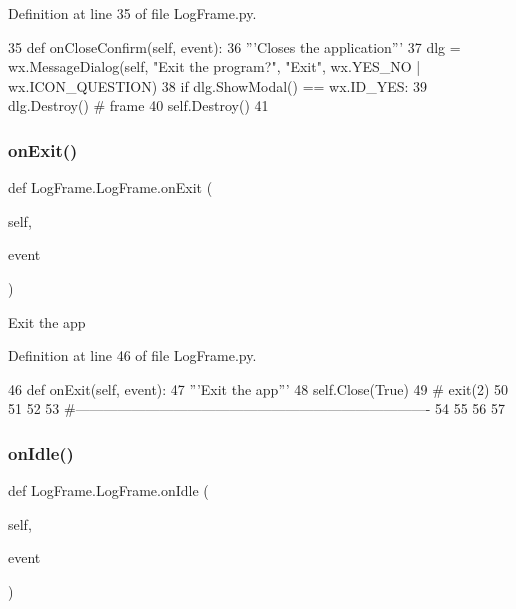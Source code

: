 Definition at line 35 of file Log\+Frame.\+py.


\begin{DoxyCode}
35     \textcolor{keyword}{def }onCloseConfirm(self, event):
36         \textcolor{stringliteral}{'''Closes the application'''}
37         dlg = wx.MessageDialog(self, \textcolor{stringliteral}{"Exit the program?"}, \textcolor{stringliteral}{"Exit"}, wx.YES\_NO | wx.ICON\_QUESTION)
38         \textcolor{keywordflow}{if} dlg.ShowModal() == wx.ID\_YES:
39             dlg.Destroy()  \textcolor{comment}{# frame}
40         self.Destroy()
41 
\end{DoxyCode}
\mbox{\label{classLogFrame_1_1LogFrame_a53ce12d6947a1e35da471e5cb9d6011b}} 
\subsubsection{\texorpdfstring{on\+Exit()}{onExit()}}
{\footnotesize\ttfamily def Log\+Frame.\+Log\+Frame.\+on\+Exit (\begin{DoxyParamCaption}\item[{}]{self,  }\item[{}]{event }\end{DoxyParamCaption})}

\begin{DoxyVerb}Exit the app\end{DoxyVerb}
 

Definition at line 46 of file Log\+Frame.\+py.


\begin{DoxyCode}
46     \textcolor{keyword}{def }onExit(self, event):
47         \textcolor{stringliteral}{'''Exit the app'''}
48         self.Close(\textcolor{keyword}{True})
49 \textcolor{comment}{#        exit(2)}
50 
51 
52 
53 \textcolor{comment}{#----------------------------------------------------------------------------}
54 
55 
56 
57 \end{DoxyCode}
\mbox{\label{classLogFrame_1_1LogFrame_af3d0abc16c93855ab9d760ff7b4c7d3e}} 
\subsubsection{\texorpdfstring{on\+Idle()}{onIdle()}}
{\footnotesize\ttfamily def Log\+Frame.\+Log\+Frame.\+on\+Idle (\begin{DoxyParamCaption}\item[{}]{self,  }\item[{}]{event }\end{DoxyParamCaption})}

